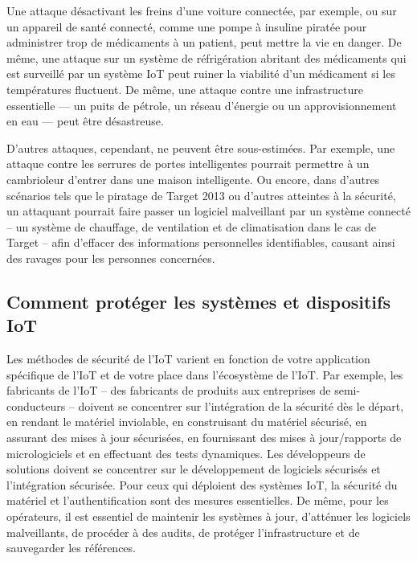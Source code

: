 Une attaque désactivant les freins d’une voiture connectée, par exemple, ou sur un appareil de santé connecté, comme une pompe à insuline piratée pour administrer trop de médicaments à un patient, peut mettre la vie en danger. De même, une attaque sur un système de réfrigération abritant des médicaments qui est surveillé par un système IoT peut ruiner la viabilité d’un médicament si les températures fluctuent. De même, une attaque contre une infrastructure essentielle — un puits de pétrole, un réseau d’énergie ou un approvisionnement en eau — peut être désastreuse.

D’autres attaques, cependant, ne peuvent être sous-estimées. Par exemple, une attaque contre les serrures de portes intelligentes pourrait permettre à un cambrioleur d’entrer dans une maison intelligente. Ou encore, dans d’autres scénarios tels que le piratage de Target 2013 ou d’autres atteintes à la sécurité, un attaquant pourrait faire passer un logiciel malveillant par un système connecté – un système de chauffage, de ventilation et de climatisation dans le cas de Target – afin d’effacer des informations personnelles identifiables, causant ainsi des ravages pour les personnes concernées.

\subsection*{Comment protéger les systèmes et dispositifs IoT}

Les méthodes de sécurité de l’IoT varient en fonction de votre application spécifique de l’IoT et de votre place dans l’écosystème de l’IoT. Par exemple, les fabricants de l’IoT – des fabricants de produits aux entreprises de semi-conducteurs – doivent se concentrer sur l’intégration de la sécurité dès le départ, en rendant le matériel inviolable, en construisant du matériel sécurisé, en assurant des mises à jour sécurisées, en fournissant des mises à jour/rapports de micrologiciels et en effectuant des tests dynamiques. Les développeurs de solutions doivent se concentrer sur le développement de logiciels sécurisés et l’intégration sécurisée. Pour ceux qui déploient des systèmes IoT, la sécurité du matériel et l’authentification sont des mesures essentielles. De même, pour les opérateurs, il est essentiel de maintenir les systèmes à jour, d’atténuer les logiciels malveillants, de procéder à des audits, de protéger l’infrastructure et de sauvegarder les références.